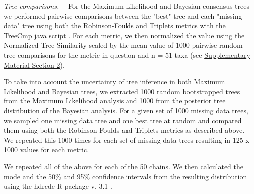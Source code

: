 \documentclass[12pt,letterpaper]{article}
\renewcommand{\subsubsection}[1]{%
\vspace{2ex}
\noindent
\textit{#1.}---}
\begin{document}
\subsubsection{Tree comparisons} %
\label{tree_comparisons}
For the Maximum Likelihood and Bayesian consensus
trees we performed pairwise comparisons between the "best" tree and each "missing-data" tree using both the Robinson-Foulds and Triplets metrics with the TreeCmp java script \citep{Bogdanowicz2012}. For each metric, we then normalized the value using the Normalized Tree Similarity scaled by the mean value of 1000 pairwise random tree comparisons for the metric in question and n = 51 taxa (see \hyperref[SupplementaryMaterial]{Supplementary Material Section 2}). %

To take into account the uncertainty of tree inference in both Maximum Likelihood and Bayesian trees, %
we extracted 1000 random bootstrapped trees from the Maximum Likelihood analysis and 1000 from the posterior tree distribution of the Bayesian analysis. %
For a given set of 1000 missing data trees, we sampled one missing data tree and one best tree at random and compared them using both the Robinson-Foulds and Triplets metrics as described above. We repeated this 1000 times for each set of missing data trees resulting in 125 x 1000 values for each metric. 

We repeated all of the above for each of the 50 chains. We then calculated the mode and the 50\% and 95\% confidence intervals from the resulting distribution using the hdrcde R package v. 3.1 \citep{hdrcde}. %
\end{document}
